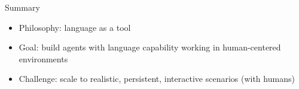 \documentclass[usenames,dvipsnames,notes]{beamer}
\begin{document}
\begin{frame}
    {Summary}
    \begin{itemize}
        \item Philosophy: language as a tool
        \item Goal: build agents with language capability working in human-centered environments
        \item Challenge: scale to realistic, persistent, interactive scenarios (with humans)
    \end{itemize}
\end{frame}
\end{document}
